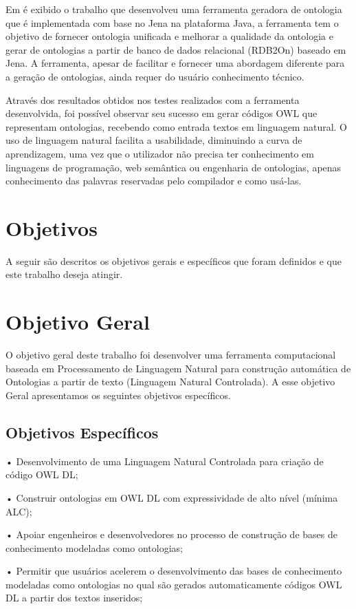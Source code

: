 \documentclass{bcc}
\begin{document}
Em \cite{zhou2010} é exibido o trabalho que desenvolveu uma ferramenta geradora de ontologia que é implementada com base no Jena na plataforma Java, a ferramenta tem o objetivo de fornecer ontologia unificada e melhorar a qualidade da ontologia e gerar de ontologias a partir de banco de dados relacional (RDB2On) baseado em Jena\cite{jena}. A ferramenta, apesar de facilitar e fornecer uma abordagem diferente para a geração de ontologias, ainda requer do usuário conhecimento técnico.

Através dos resultados obtidos nos testes realizados com a ferramenta desenvolvida, foi possível observar seu sucesso em gerar códigos OWL que representam ontologias, recebendo como entrada textos em linguagem natural. O uso de linguagem natural facilita a usabilidade, diminuindo a curva de aprendizagem, uma vez que o utilizador não precisa ter conhecimento em linguagens de programação, web semântica ou engenharia de ontologias, apenas conhecimento das palavras reservadas pelo compilador e como usá-las.


\section{Objetivos}

A seguir são descritos os objetivos gerais e específicos que foram definidos e que este trabalho deseja atingir.

\section{Objetivo Geral}
O objetivo geral deste trabalho foi desenvolver uma ferramenta computacional baseada em Processamento de Linguagem Natural para construção automática de Ontologias a partir de texto (Linguagem Natural Controlada). A esse objetivo Geral apresentamos os seguintes objetivos específicos.

\subsection{Objetivos Específicos}
•	Desenvolvimento de uma Linguagem Natural Controlada para criação de código OWL DL;

•	Construir ontologias em OWL DL com expressividade de alto nível (mínima ALC);

•	Apoiar engenheiros e desenvolvedores no processo de construção de bases de conhecimento modeladas como ontologias;

•	Permitir que usuários acelerem o desenvolvimento das bases de conhecimento modeladas como ontologias no qual são gerados automaticamente códigos OWL DL a partir dos textos inseridos;
\end{document}
